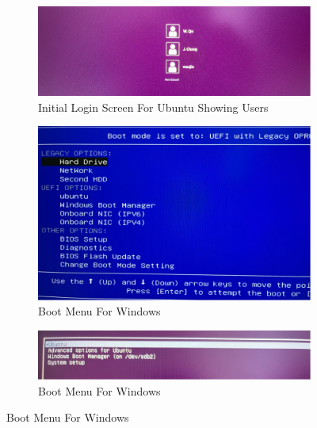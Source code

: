 \documentclass[manuscript,acmsmall,anonymous,review,screen,nonacm=true, authorversion=true]{acmart}
\begin{document}
\begin{figure}
    \centering
   \begin{subfigure}{.45\textwidth}
    \begin{centering}
    \includegraphics[scale=0.5]{pict/Picture1.png}
    \caption{Initial Login Screen For Ubuntu Showing Users}
    \end{centering}
\end{subfigure}
\begin{subfigure}{.5\textwidth}
    \begin{centering}
    \includegraphics[scale=0.5]{pict/Picture2.png}
    \caption{Boot Menu For Windows}
    \end{centering}
\end{subfigure}
 \begin{subfigure}{.45\textwidth}
    \begin{centering}
    \includegraphics[scale=0.5]{pict/Picture3.png}
    \caption{Boot Menu For Windows}
    \end{centering}
\end{subfigure}

\end{figure}
\end{document}
